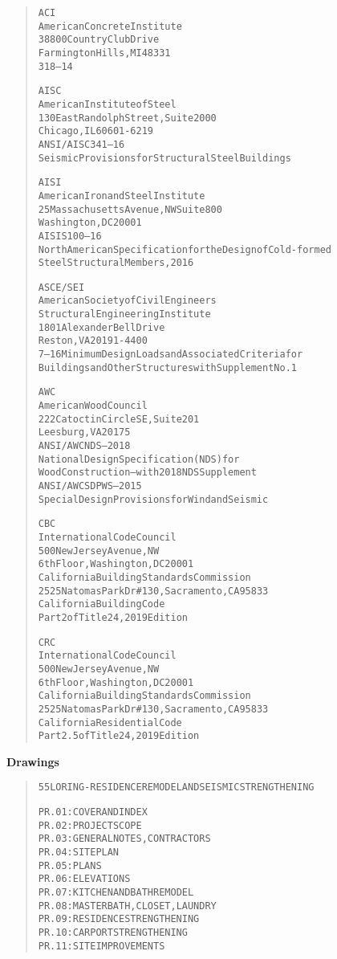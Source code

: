 \documentclass[12pt,notitle,letterpaper]{report}
\begin{document}
\begin{quote}
\begin{alltt}
ACI
American Concrete Institute
38800 Country Club Drive
Farmington Hills, MI 48331
318—14

AISC
American Institute of Steel
130 East Randolph Street, Suite 2000
Chicago, IL 60601-6219
ANSI/AISC 341—16
Seismic Provisions for Structural Steel Buildings

AISI
American Iron and Steel Institute
25 Massachusetts Avenue, NW Suite 800
Washington, DC 20001
AISI S100—16
North American Specification for the Design of Cold-formed
Steel Structural Members, 2016

ASCE/SEI
American Society of Civil Engineers
Structural Engineering Institute
1801 Alexander Bell Drive
Reston, VA 20191-4400
7—16 Minimum Design Loads and Associated Criteria for
Buildings and Other Structures with Supplement No. 1

AWC
American Wood Council
222 Catoctin Circle SE, Suite 201
Leesburg, VA 20175
ANSI/AWC NDS—2018
National Design Specification (NDS) for
Wood Construction—with 2018 NDS Supplement
ANSI/AWC SDPWS—2015
Special Design Provisions for Wind and Seismic

CBC
International Code Council
500 New Jersey Avenue, NW
6th Floor, Washington, DC 20001
California Building Standards Commission
2525 Natomas Park Dr # 130, Sacramento, CA 95833
California Building Code
Part 2 of Title 24, 2019 Edition

CRC
International Code Council
500 New Jersey Avenue, NW
6th Floor, Washington, DC 20001
California Building Standards Commission
2525 Natomas Park Dr # 130, Sacramento, CA 95833
California Residential Code
Part 2.5 of Title 24, 2019 Edition
\end{alltt}
\end{quote}

\begin{center} \textbf{Drawings } \end{center}

\begin{quote}
\begin{alltt}
55 LORING - RESIDENCE REMODEL AND SEISMIC STRENGTHENING

PR.01: COVER AND INDEX
PR.02: PROJECT SCOPE
PR.03: GENERAL NOTES, CONTRACTORS
PR.04: SITE PLAN
PR.05: PLANS
PR.06: ELEVATIONS
PR.07: KITCHEN AND BATH REMODEL
PR.08: MASTER BATH, CLOSET, LAUNDRY
PR.09: RESIDENCE STRENGTHENING
PR.10: CARPORT STRENGTHENING
PR.11: SITE IMPROVEMENTS
\end{alltt}
\end{quote}
\end{document}
